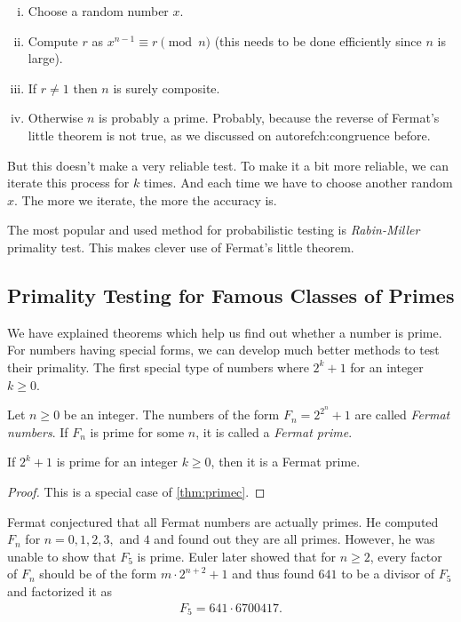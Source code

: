 	\begin{enumerate}[i.]
		\item Choose a random number $x$.
		\item Compute $r$ as $x^{n-1}\equiv r\pmod n$ (this needs to be done efficiently since $n$ is large).
		\item If $r\neq1$ then $n$ is surely composite.
		\item Otherwise $n$ is probably a prime. Probably, because the reverse of Fermat's little theorem is not true, as we discussed on autoref{ch:congruence} before.
	\end{enumerate}
But this doesn't make a very reliable test. To make it a bit more reliable, we can iterate this process for $k$ times. And each time we have to choose another random $x$. The more we iterate, the more the accuracy is.

The most popular and used method for probabilistic testing is \textit{Rabin-Miller} primality test. This makes clever use of Fermat's little theorem.

\subsection{Primality Testing for Famous Classes of Primes}
We have explained theorems which help us find out whether a number is prime. For numbers having special forms, we can develop much better methods to test their primality. The first special type of numbers where $2^k+1$ for an integer $k \geq 0$.

	\begin{definition}
		Let $n\geq 0$ be an integer. The numbers of the form $F_n = 2^{2^n}+1$ are called \textit{Fermat numbers}. If $F_n$ is prime for some $n$, it is called a \textit{Fermat prime}.
	\end{definition}

	\begin{proposition}
		If $2^k+1$ is prime for an integer $k \geq 0$, then it is a Fermat prime.
	\end{proposition}

	\begin{proof}
		This is a special case of \autoref{thm:primec}.
	\end{proof}

Fermat conjectured that all Fermat numbers are actually primes. He computed $F_n$ for $n=0,1,2,3,$ and $4$ and found out they are all primes. However, he was unable to show that $F_5$ is prime. Euler later showed that for $n\geq 2$, every factor of $F_n$ should be of the form $m\cdot 2^{n+2}+1$ and thus found $641$ to be a divisor of $F_5$ and factorized it as
	\begin{align*}
	F_5 = 641 \cdot 6700417.
	\end{align*}

